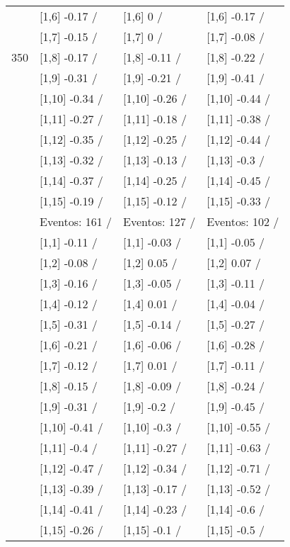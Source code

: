 \begin{table}
\begin{tabular}[t]{llll}
 & {}[1,6] -0.17  / & {}[1,6] 0  / & {}[1,6] -0.17  /\\
 & {}[1,7] -0.15  / & {}[1,7] 0  / & {}[1,7] -0.08  /\\
350 & {}[1,8] -0.17  / & {}[1,8] -0.11  / & {}[1,8] -0.22  /\\
\addlinespace
 & {}[1,9] -0.31  / & {}[1,9] -0.21  / & {}[1,9] -0.41  /\\
 & {}[1,10] -0.34  / & {}[1,10] -0.26  / & {}[1,10] -0.44  /\\
 & {}[1,11] -0.27  / & {}[1,11] -0.18  / & {}[1,11] -0.38  /\\
 & {}[1,12] -0.35  / & {}[1,12] -0.25  / & {}[1,12] -0.44  /\\
 & {}[1,13] -0.32  / & {}[1,13] -0.13  / & {}[1,13] -0.3  /\\
\addlinespace
 & {}[1,14] -0.37  / & {}[1,14] -0.25  / & {}[1,14] -0.45  /\\
 & {}[1,15] -0.19  / & {}[1,15] -0.12  / & {}[1,15] -0.33  /\\
 & Eventos:  161 / & Eventos:  127 / & Eventos:  102 /\\
 & {}[1,1] -0.11  / & {}[1,1] -0.03  / & {}[1,1] -0.05  /\\
 & {}[1,2] -0.08  / & {}[1,2] 0.05  / & {}[1,2] 0.07  /\\
\addlinespace
 & {}[1,3] -0.16  / & {}[1,3] -0.05  / & {}[1,3] -0.11  /\\
 & {}[1,4] -0.12  / & {}[1,4] 0.01  / & {}[1,4] -0.04  /\\
 & {}[1,5] -0.31  / & {}[1,5] -0.14  / & {}[1,5] -0.27  /\\
 & {}[1,6] -0.21  / & {}[1,6] -0.06  / & {}[1,6] -0.28  /\\
 & {}[1,7] -0.12  / & {}[1,7] 0.01  / & {}[1,7] -0.11  /\\
\addlinespace
500 & {}[1,8] -0.15  / & {}[1,8] -0.09  / & {}[1,8] -0.24  /\\
 & {}[1,9] -0.31  / & {}[1,9] -0.2  / & {}[1,9] -0.45  /\\
 & {}[1,10] -0.41  / & {}[1,10] -0.3  / & {}[1,10] -0.55  /\\
 & {}[1,11] -0.4  / & {}[1,11] -0.27  / & {}[1,11] -0.63  /\\
 & {}[1,12] -0.47  / & {}[1,12] -0.34  / & {}[1,12] -0.71  /\\
\addlinespace
 & {}[1,13] -0.39  / & {}[1,13] -0.17  / & {}[1,13] -0.52  /\\
 & {}[1,14] -0.41  / & {}[1,14] -0.23  / & {}[1,14] -0.6  /\\
 & {}[1,15] -0.26  / & {}[1,15] -0.1  / & {}[1,15] -0.5  /\\
\bottomrule
\end{tabular}
\end{table}
